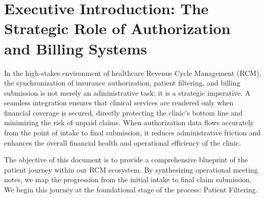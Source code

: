 \documentclass[11pt,a4paper]{article}
\begin{document}
\section{Executive Introduction: The Strategic Role of Authorization and Billing Systems}

In the high-stakes environment of healthcare Revenue Cycle Management (RCM), the synchronization of insurance authorization, patient filtering, and billing submission is not merely an administrative task; it is a strategic imperative. A seamless integration ensures that clinical services are rendered only when financial coverage is secured, directly protecting the clinic's bottom line and minimizing the risk of unpaid claims. When authorization data flows accurately from the point of intake to final submission, it reduces administrative friction and enhances the overall financial health and operational efficiency of the clinic.

The objective of this document is to provide a comprehensive blueprint of the patient journey within our RCM ecosystem. By synthesizing operational meeting notes, we map the progression from the initial intake to final claim submission. We begin this journey at the foundational stage of the process: Patient Filtering.
\end{document}
